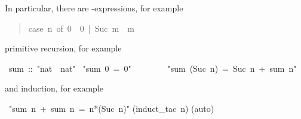 \begin{isabelle}%
%
\begin{isamarkuptext}%
\noindent
In particular, there are -expressions, for example
\begin{quote}

\begin{isabelle}%
case\ n\ of\ 0\ {\isasymRightarrow}\ 0\ |\ Suc\ m\ {\isasymRightarrow}\ m
\end{isabelle}%

\end{quote}
primitive recursion, for example%
\end{isamarkuptext}%
\ sum\ ::\ {"}nat\ {\isasymRightarrow}\ nat{"}\isanewline
{}\ {"}sum\ 0\ =\ 0{"}\isanewline
\ \ \ \ \ \ \ \ {"}sum\ (Suc\ n)\ =\ Suc\ n\ +\ sum\ n{"}%
\begin{isamarkuptext}%
\noindent
and induction, for example%
\end{isamarkuptext}%
\ {"}sum\ n\ +\ sum\ n\ =\ n*(Suc\ n){"}\isanewline
{}(induct\_tac\ n)\isanewline
{}(auto)\isanewline
\end{isabelle}%
